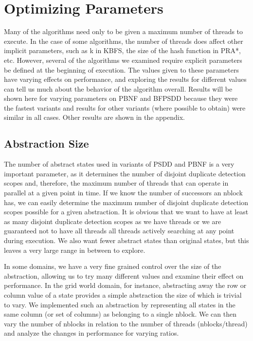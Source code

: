 \documentclass{article}
\begin{document}
\section{Optimizing Parameters}
Many of the algorithms need only to be given a maximum number of threads to execute. In the case of some algorithms, the number of threads does affect other implicit parameters, such as k in KBFS, the size of the hash function in PRA*, etc. However, several of the algorithms we examined require explicit parameters be defined at the beginning of execution. The values given to these parameters have varying effects on performance, and exploring the results for different values can tell us much about the behavior of the algorithm overall. Results will be shown here for varying parameters on PBNF and BFPSDD because they were the fastest variants and results for other variants (where possible to obtain) were similar in all cases. Other results are shown in the appendix.
\subsection{Abstraction Size}
The number of abstract states used in variants of PSDD and PBNF is a very important parameter, as it determines the number of disjoint duplicate detection scopes and, therefore, the maximum number of threads that can operate in parallel at a given point in time. If we know the number of successors an nblock has, we can easily determine the maximum number of disjoint duplicate detection scopes possible for a given abstraction. It is obvious that we want to have at least as many disjoint duplicate detection scopes as we have threads or we are guaranteed not to have all threads all threads actively searching at any point during execution. We also want fewer abstract states than original states, but this leaves a very large range in between to explore.

In some domains, we have a very fine grained control over the size of the abstraction, allowing us to try many different values and examine their effect on performance. In the grid world domain, for instance, abstracting away the row or column value of a state provides a simple abstraction the size of which is trivial to vary. We implemented such an abstraction by representing all states in the same column (or set of columns) as belonging to a single nblock. We can then vary the number of nblocks in relation to the number of threads (nblocks/thread) and analyze the changes in performance for varying ratios.
\end{document}
